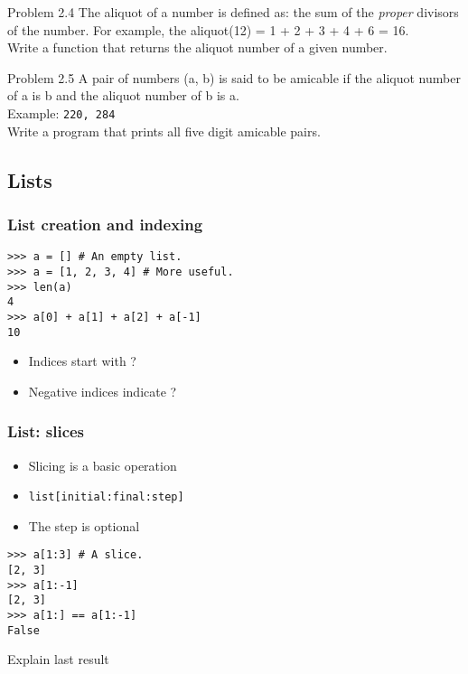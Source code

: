 \documentclass[14pt,compress]{beamer}
\newcounter{time}
\newcommand{\inctime}[1]{\addtocounter{time}{#1}{\tiny \thetime\ m}}
\newcommand{\typ}[1]{\texttt{#1}}
\begin{document}
\begin{frame}{Problem 2.4}
  The aliquot of a number is defined as: the sum of the \emph{proper} divisors of the number. For example, the aliquot(12) = 1 + 2 + 3 + 4 + 6 = 16.\\
  Write a function that returns the aliquot number of a given number. 
\end{frame}

\begin{frame}{Problem 2.5}
  A pair of numbers (a, b) is said to be \alert{amicable} if the aliquot number of a is b and the aliquot number of b is a.\\
  Example: \texttt{220, 284}\\
  Write a program that prints all five digit amicable pairs.
  \inctime{25}
\end{frame}


\subsection{Lists}

\begin{frame}[fragile]
  \frametitle{List creation and indexing}
\begin{lstlisting}
>>> a = [] # An empty list.
>>> a = [1, 2, 3, 4] # More useful.
>>> len(a) 
4
>>> a[0] + a[1] + a[2] + a[-1]
10
\end{lstlisting}
  \begin{itemize}
  \item Indices start with ?
  \item Negative indices indicate ?
  \end{itemize}
\end{frame}

\begin{frame}[fragile]
  \frametitle{List: slices}
  \begin{itemize}
  \item Slicing is a basic operation
  \item \typ{list[initial:final:step]}
  \item  The step is optional
  \end{itemize}
\begin{lstlisting}
>>> a[1:3] # A slice.
[2, 3]
>>> a[1:-1]
[2, 3]
>>> a[1:] == a[1:-1]
False  
\end{lstlisting}
Explain last result
\end{frame}
\end{document}
